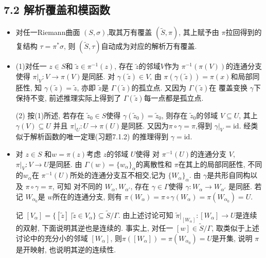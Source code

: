 \subsection*{7.2 解析覆盖和模函数}

\begin{itemize}
    
    \item[7.2.1] 对任一Riemann曲面 $(S,\sigma)$,取其万有覆盖 $(\tilde{S},\pi)$,
    其上赋予由 $\pi$拉回得到的复结构 $\tau = \pi^* \sigma $, 
    则 $(\tilde{S},\tau)$自动成为对应的解析万有覆盖.
    \item[7.2.2]  (1)对任一 $z \in S$和 $\tilde{z} \in \pi^{-1}(z)$,
    存在 $\tilde{z}$的邻域$V$作为 $\pi^{-1}(\pi(V))$的连通分支
    使得 $\pi|_{V}:V\to \pi(V)$是同胚. 
    对 $\gamma(\tilde{z})\in V$, 由 $\pi(\gamma(\tilde{z})) = \pi(x)$和局部同胚性, 
    知 $\gamma(\tilde{z})=\tilde{z}$, 亦即 $\tilde{z}$是 $\Gamma(\tilde{z})$的孤立点. 
    又因为 $\Gamma(\tilde{z})$在 覆盖变换 $\gamma$下保持不变, 
    前述推理实际上得到了 $\Gamma(\tilde{z})$每一点都是孤立点.
    
    (2) 按(1)所述, 若存在 $\tilde{z}_0\in S$使得 $\gamma(\tilde{z}_0)=\tilde{z}_0$, 
    则存在 $\tilde{z}_0$的邻域 $V \subseteq U$, 
    其上 $\gamma(V)\subseteq U$ 并且 $\pi|_{U}:U\to \pi(U)$是同胚. 
    又因为$\pi\circ\gamma=\pi$,得到 $\gamma|_{V}=\text{id}$. 
    经类似于解析函数的唯一定理(习题7.1.2) 的推理得到 $\gamma=\text{id}$.

    
    \item[7.2.3] 对 $z \in S$ 和$w=\pi(z)$考虑 $z$的邻域 $U$使得
    对 $\pi^{-1}(U)$的连通分支 $V$, $\pi|_{V}:V\to U$是同胚. 
    由 $\Gamma(w)= \{w_\alpha\}_{\alpha}$的离散性和 $\pi$在其上的局部同胚性,
    不同的$w_\alpha$在 $\pi^{-1}(U)$所处的连通分支互不相交,记为 $\{W_\alpha\}_\alpha$. 
    由 $\gamma$是共形自同构以及 $\pi \circ \gamma = \pi$, 
    可知 对不同的 $W_\alpha, W_{\alpha'}$, 
    存在 $\gamma \in \Gamma$使得 $\gamma:W_\alpha\to W_{\alpha'}$  是同胚. 
    若记 $W_{\alpha_0}$是 $w$所在的连通分支,  
    则有 $\pi(W_\alpha) = \pi \circ \gamma(W_\alpha) = \pi(W_{\alpha_0}) = U $. 
    
    记 $[V_\alpha] = \{[\tilde{z}]\ | \tilde{z} \in V_\alpha\}
    \subseteq \tilde{S}/ \Gamma $.  由上述讨论可知
    $\tilde{\pi} |_{[W_{\alpha}]}: [W_\alpha]\to U$是连续的双射,
    下面说明其逆也是连续的. 事实上, 对任一 $[w] \in \tilde{S}/\Gamma$,
    取类似于上述讨论中的充分小的邻域 $[W_\alpha]$, 
    则$\pi([W_{\alpha}]) = \pi(W_{\alpha_0}) =U$是开集,
    说明 $\pi$是开映射, 也说明其逆的连续性.
    

\end{itemize}
